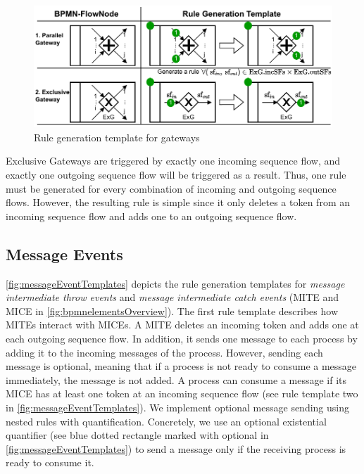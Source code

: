 \documentclass[runningheads]{llncs}
\begin{document}
\begin{figure}[ht]
    \centering
    \includegraphics[width=1\textwidth]{images/gateways_template.pdf}
    \caption{Rule generation template for gateways}
    \label{fig:gatewayTemplates}
\end{figure}

Exclusive Gateways are triggered by exactly one incoming sequence flow, and exactly one outgoing sequence flow will be triggered as a result.
Thus, one rule must be generated for every combination of incoming and outgoing sequence flows.
However, the resulting rule is simple since it only deletes a token from an incoming sequence flow and adds one to an outgoing sequence flow.

\subsection{Message Events}
\autoref{fig:messageEventTemplates} depicts the rule generation templates for \textit{message intermediate throw events} and \textit{message intermediate catch events} (\textsf{MITE} and \textsf{MICE} in \autoref{fig:bpmnelementsOverview}).
The first rule template describes how MITEs interact with MICEs.
A MITE deletes an incoming token and adds one at each outgoing sequence flow.
In addition, it sends one message to each process by adding it to the incoming messages of the process.
However, sending each message is optional, meaning that if a process is not ready to consume a message immediately, the message is not added.
A process can consume a message if its MICE has at least one token at an incoming sequence flow (see rule template two in \autoref{fig:messageEventTemplates}).
We implement optional message sending using nested rules with quantification.
Concretely, we use an optional existential quantifier \cite{rensinkNestedQuantificationGraph2006} (see blue dotted rectangle marked with optional in \autoref{fig:messageEventTemplates}) to send a message only if the receiving process is ready to consume it.
\end{document}
